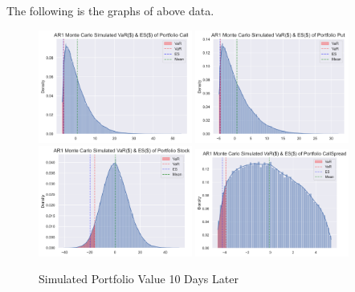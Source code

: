 \documentclass[11pt,en]{elegantpaper}
\begin{document}
The following is the graphs of above data.

\begin{figure}[htbp] 
    \centering 
    \includegraphics[width=0.45\textwidth]{./image/image_3/Simulation/Call.png} 
    \includegraphics[width=0.45\textwidth]{./image/image_3/Simulation/Put.png} 
    \includegraphics[width=0.45\textwidth]{./image/image_3/Simulation/Stock.png}
    \includegraphics[width=0.45\textwidth]{./image/image_3/Simulation/CallSpread.png} 
    \caption{Simulated Portfolio Value 10 Days Later}
\end{figure}
\end{document}

